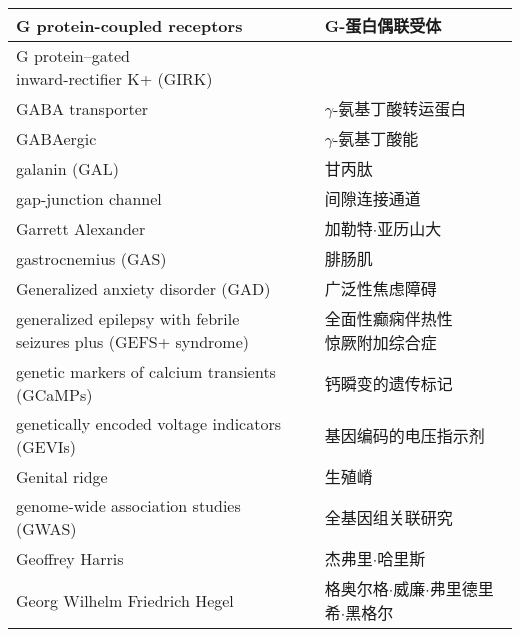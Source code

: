 \begin{longtable}{lll}
	\midrule
	G protein-coupled receptors    &&  G-蛋白偶联受体  \\
	
	\midrule
	\makecell[l]{G protein–gated \\ inward-rectifier K+ (GIRK)}    &&  \makecell[l]{G蛋白门控的内向整流钾}  \\
	
	\midrule
	GABA transporter    &&  $\gamma$-氨基丁酸转运蛋白  \\
	
	\midrule
	GABAergic    &&  $\gamma$-氨基丁酸能  \\
	
	\midrule
	galanin (GAL)   &&  甘丙肽  \\
	
	\midrule
	gap-junction channel    &&  间隙连接通道  \\
	
	\midrule
	Garrett Alexander    &&  加勒特$\cdot$亚历山大  \\
	
	\midrule
	gastrocnemius (GAS)    &&  腓肠肌  \\
	
	\midrule
	Generalized anxiety disorder (GAD)     &&  广泛性焦虑障碍  \\
	
	\midrule
	\makecell[l]{generalized epilepsy with febrile \\ seizures plus (GEFS+ syndrome)}     &&  \makecell[l]{全面性癫痫伴热性\\惊厥附加综合症}  \\
	
	\midrule
	genetic markers of calcium transients (GCaMPs)   &&  钙瞬变的遗传标记  \\
	
	\midrule
	genetically encoded voltage indicators (GEVIs)   &&  基因编码的电压指示剂  \\
	
	\midrule
	Genital ridge     &&  生殖嵴  \\
	
	\midrule
	genome-wide association studies (GWAS)     &&  全基因组关联研究  \\
	
	\midrule
	Geoffrey Harris     &&  杰弗里$\cdot$哈里斯  \\
	
	\midrule
	Georg Wilhelm Friedrich Hegel     &&  格奥尔格$\cdot$威廉$\cdot$弗里德里希$\cdot$黑格尔  \\
	

\end{longtable}
